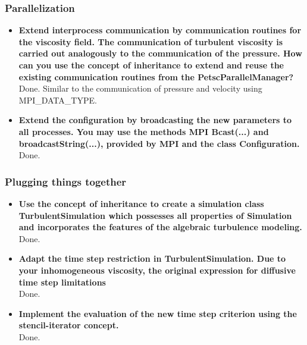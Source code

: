 \documentclass[a4paper]{article}
\begin{document}
\subsubsection{Parallelization}
\begin{itemize}
	\item \textbf{Extend interprocess communication by communication routines for the viscosity field. The communication of turbulent viscosity is carried out analogously to the communication of the pressure. How can you use the concept of inheritance to extend and reuse the existing communication routines from the PetscParallelManager?}\\
	Done. Similar to the communication of pressure and velocity using MPI\_DATA\_TYPE.
	\item \textbf{Extend the configuration by broadcasting the new parameters to all processes. You may use the methods MPI Bcast(...) and broadcastString(...), provided by MPI and the class Configuration.}\\
	Done.
\end{itemize}
\subsubsection{Plugging things together}
\begin{itemize}
	\item \textbf{Use the concept of inheritance to create a simulation class TurbulentSimulation which possesses all properties of Simulation and incorporates the features of the algebraic turbulence modeling.}\\
	Done.
	\item \textbf{Adapt the time step restriction in TurbulentSimulation. Due to your inhomogeneous viscosity, the original expression for diffusive time step limitations}\\
	Done.
	\item \textbf{Implement the evaluation of the new time step criterion using the stencil-iterator concept.}\\
	Done.
	
	
\end{itemize}
\end{document}
